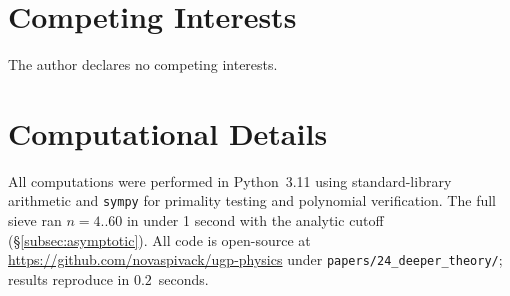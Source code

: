 \documentclass[11pt]{article}
\theoremstyle{remark}
\begin{document}
\section*{Competing Interests}
The author declares no competing interests.




\appendix

\section{Computational Details}
\label{app:computation}

All computations were performed in Python~3.11 using standard-library arithmetic
and \texttt{sympy} for primality testing and polynomial verification.
The full sieve ran $n{=}4$..60 in under 1 second with the analytic cutoff
(\S\ref{subsec:asymptotic}).
All code is open-source at \url{https://github.com/novaspivack/ugp-physics}
under \texttt{papers/24\_deeper\_theory/}; results reproduce in $0.2$~seconds.
\end{document}
